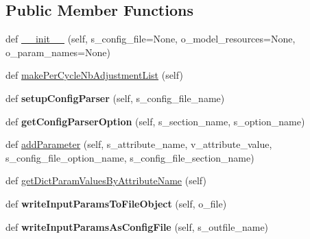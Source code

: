 \subsection*{Public Member Functions}
\begin{DoxyCompactItemize}
\item 
def \hyperlink{classnegui_1_1pginputsimupop_1_1PGInputSimuPop_a1452a83a005c9d30e778b34ae67a399f}{\+\_\+\+\_\+init\+\_\+\+\_\+} (self, s\+\_\+config\+\_\+file=None, o\+\_\+model\+\_\+resources=None, o\+\_\+param\+\_\+names=None)
\item 
def \hyperlink{classnegui_1_1pginputsimupop_1_1PGInputSimuPop_a2b7640b16f073f0b018b9269600e6023}{make\+Per\+Cycle\+Nb\+Adjustment\+List} (self)
\item 
def {\bfseries setup\+Config\+Parser} (self, s\+\_\+config\+\_\+file\+\_\+name)\hypertarget{classnegui_1_1pginputsimupop_1_1PGInputSimuPop_a3f1295816cd5e708646d49e1d4f3fb1c}{}\label{classnegui_1_1pginputsimupop_1_1PGInputSimuPop_a3f1295816cd5e708646d49e1d4f3fb1c}

\item 
def {\bfseries get\+Config\+Parser\+Option} (self, s\+\_\+section\+\_\+name, s\+\_\+option\+\_\+name)\hypertarget{classnegui_1_1pginputsimupop_1_1PGInputSimuPop_abe1cda382edb5f59e3c01f2bee5b63c8}{}\label{classnegui_1_1pginputsimupop_1_1PGInputSimuPop_abe1cda382edb5f59e3c01f2bee5b63c8}

\item 
def \hyperlink{classnegui_1_1pginputsimupop_1_1PGInputSimuPop_aa990ef0c582a28a456a355a4eb3af2b9}{add\+Parameter} (self, s\+\_\+attribute\+\_\+name, v\+\_\+attribute\+\_\+value, s\+\_\+config\+\_\+file\+\_\+option\+\_\+name, s\+\_\+config\+\_\+file\+\_\+section\+\_\+name)
\item 
def \hyperlink{classnegui_1_1pginputsimupop_1_1PGInputSimuPop_a099e2f01dabe86e713df7519a08fecca}{get\+Dict\+Param\+Values\+By\+Attribute\+Name} (self)
\item 
def {\bfseries write\+Input\+Params\+To\+File\+Object} (self, o\+\_\+file)\hypertarget{classnegui_1_1pginputsimupop_1_1PGInputSimuPop_affc2fd6bd54b8f1ed84801b2f7f2da4b}{}\label{classnegui_1_1pginputsimupop_1_1PGInputSimuPop_affc2fd6bd54b8f1ed84801b2f7f2da4b}

\item 
def {\bfseries write\+Input\+Params\+As\+Config\+File} (self, s\+\_\+outfile\+\_\+name)\hypertarget{classnegui_1_1pginputsimupop_1_1PGInputSimuPop_a6264dda65b65dc05f2bb32a1c0be103d}{}\label{classnegui_1_1pginputsimupop_1_1PGInputSimuPop_a6264dda65b65dc05f2bb32a1c0be103d}


\end{DoxyCompactItemize}
